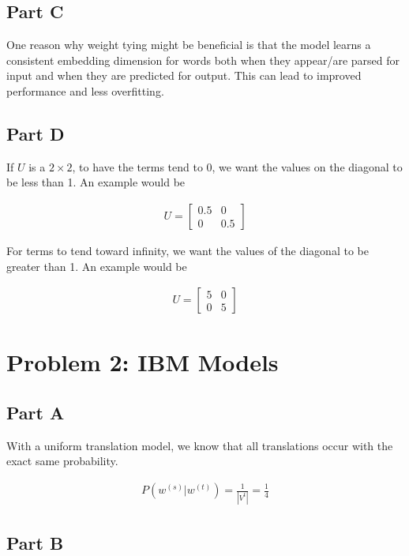 \documentclass[a4 paper]{article}
\numberwithin{equation}{section}
\newcommand{\0}{\mathbf{0}}
\begin{document}
\subsection*{Part C}

One reason why weight tying might be beneficial is that the model learns a consistent embedding dimension for words both when they appear/are parsed for input and when they are predicted for output. This can lead to improved performance and less overfitting.

\subsection*{Part D}

If $U$ is a $2 \times 2$, to have the terms tend to 0, we want the values on the diagonal to be less than 1. An example would be 

\begin{align*}
    U = \boxed{\begin{bmatrix}
        0.5 & 0 \\ 0 & 0.5
    \end{bmatrix}}
\end{align*}

For terms to tend toward infinity, we want the values of the diagonal to be greater than 1. An example would be

\begin{align*}
    U = \boxed{\begin{bmatrix}
        5 & 0 \\ 0 & 5
    \end{bmatrix}}
\end{align*}

\newpage
\section*{Problem 2: IBM Models}

\subsection*{Part A}

With a uniform translation model, we know that all translations occur with the exact same probability. 

\begin{align*}
    P(w^{(s)} | w^{(t)}) = \frac{1}{|V^t|} = \boxed{\frac{1}{4}}
\end{align*}

\subsection*{Part B}
\end{document}

